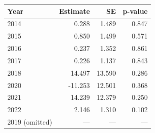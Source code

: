 \begin{tabular}{lrrr}
\toprule
Year & Estimate & SE & p-value \\
\midrule
2014 & 0.288 & 1.489 & 0.847 \\
2015 & 0.850 & 1.499 & 0.571 \\
2016 & 0.237 & 1.352 & 0.861 \\
2017 & 0.226 & 1.137 & 0.843 \\
2018 & 14.497 & 13.590 & 0.286 \\
2020 & -11.253 & 12.501 & 0.368 \\
2021 & 14.239 & 12.379 & 0.250 \\
2022 & 2.146 & 1.310 & 0.102 \\
2019 (omitted) & --- & --- & --- \\
\bottomrule
\end{tabular}
